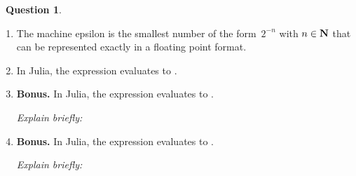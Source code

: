 \documentclass[10pt]{article}
\theoremstyle{definition}
\newtheorem{question}{{\normalfont \faGears}~Question}
\begin{document}
\begin{question}
\begin{enumerate}
        \item
            The machine epsilon is the smallest number of the form~$2^{-n}$ with $n \in \mathbf N$ that can be represented exactly in a floating point format.

        \item
            In Julia, the expression  evaluates to .

        \item
            \textbf{Bonus.}
            In Julia, the expression  evaluates to .

            \textit{Explain briefly:}
            \vspace{1cm}

        \item
            \textbf{Bonus.}
            In Julia, the expression  evaluates to .

            \textit{Explain briefly:}
            \vspace{1cm}
    \end{enumerate}
\end{question}
\end{document}
